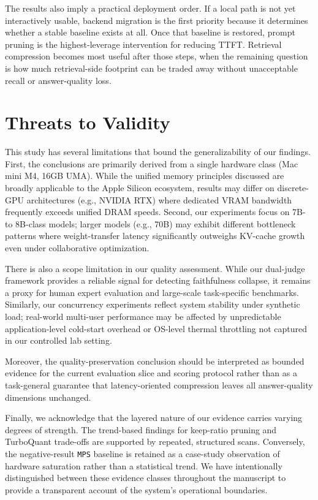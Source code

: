\documentclass[10pt,twocolumn]{article}
\begin{document}
The results also imply a practical deployment order. If a local path is not yet interactively usable, backend migration is the first priority because it determines whether a stable baseline exists at all. Once that baseline is restored, prompt pruning is the highest-leverage intervention for reducing TTFT. Retrieval compression becomes most useful after those steps, when the remaining question is how much retrieval-side footprint can be traded away without unacceptable recall or answer-quality loss.

\section{Threats to Validity}

This study has several limitations that bound the generalizability of our findings. First, the conclusions are primarily derived from a single hardware class (Mac mini M4, 16GB UMA). While the unified memory principles discussed are broadly applicable to the Apple Silicon ecosystem, results may differ on discrete-GPU architectures (e.g., NVIDIA RTX) where dedicated VRAM bandwidth frequently exceeds unified DRAM speeds. Second, our experiments focus on 7B- to 8B-class models; larger models (e.g., 70B) may exhibit different bottleneck patterns where weight-transfer latency significantly outweighs KV-cache growth even under collaborative optimization.

There is also a scope limitation in our quality assessment. While our dual-judge framework provides a reliable signal for detecting faithfulness collapse, it remains a proxy for human expert evaluation and large-scale task-specific benchmarks. Similarly, our concurrency experiments reflect system stability under synthetic load; real-world multi-user performance may be affected by unpredictable application-level cold-start overhead or OS-level thermal throttling not captured in our controlled lab setting.

Moreover, the quality-preservation conclusion should be interpreted as bounded evidence for the current evaluation slice and scoring protocol rather than as a task-general guarantee that latency-oriented compression leaves all answer-quality dimensions unchanged.

Finally, we acknowledge that the layered nature of our evidence carries varying degrees of strength. The trend-based findings for keep-ratio pruning and TurboQuant trade-offs are supported by repeated, structured scans. Conversely, the negative-result \texttt{MPS} baseline is retained as a case-study observation of hardware saturation rather than a statistical trend. We have intentionally distinguished between these evidence classes throughout the manuscript to provide a transparent account of the system's operational boundaries.
\end{document}
